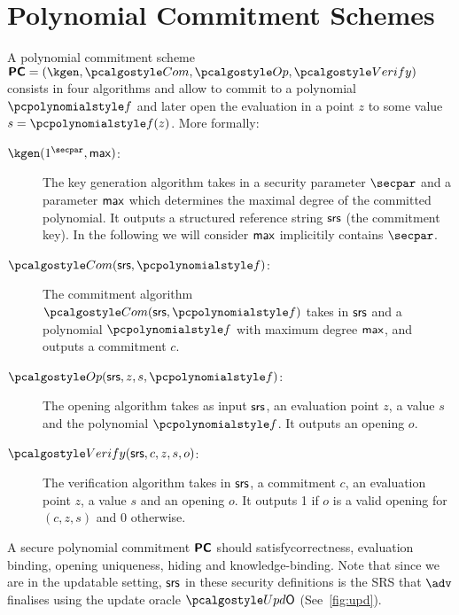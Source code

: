 
\section{Polynomial Commitment Schemes}
\label{sec:pcom}
A polynomial commitment scheme $\PCOM = (\kgen, \com, \open, \verify)$ consists in four algorithms and allow to commit to a
polynomial $\p{f}$ and later open the evaluation in a point $z$ to some value $s=\p{f}(z)$. More formally: 
\begin{description}
\item[$\kgen(1^\secpar, \maxdeg)$:] The key generation algorithm
   takes in a security parameter $\secpar$ and a
  parameter $\mathsf{max}$ which determines the maximal degree of the committed
  polynomial. It outputs a structured reference string $\mathsf{srs}$ (the
  commitment key). In the following we will consider $\mathsf{max}$ implicitily contains $\secpar$. 
\item[$\com(\srs, \p{f})$:] The commitment algorithm $\com(\srs, \p{f})$ takes
  in $\mathsf{srs}$ and a polynomial $\p{f}$ with maximum degree $\mathsf{max}$, and outputs
  a commitment $c$.
\item[$\open(\srs, z, s, \p{f})$:] The opening algorithm
  takes as input $\mathsf{srs}$, an evaluation point $z$, a
  value $s$ and the polynomial $\p{f}$. It outputs an opening $o$.
\item[$\verify(\srs, c, z, s, o)$:] The verification algorithm takes in $\mathsf{srs}$,
  a commitment $c$, an evaluation point $z$, a value $s$ and an opening $o$. It
  outputs 1 if $o$ is a valid opening for $(c, z, s)$ and 0 otherwise.
\end{description} 

A secure polynomial commitment $\bm{\mathsf{PC}}$ should satisfycorrectness, evaluation binding,  opening uniqueness, hiding and knowledge-binding. 
Note that since we are in the updatable setting, $\mathsf{srs}$ in these security definitions is the SRS that $\advse$ finalises using the update oracle $\initU$ (See~\cref{fig:upd}).

